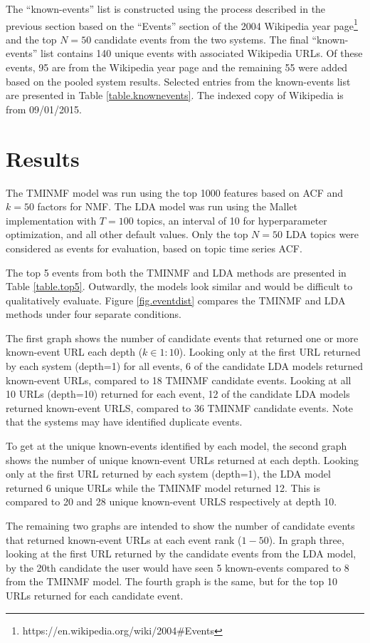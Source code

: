 \documentclass{sig-alternate}
\begin{document}
The ``known-events'' list is constructed using the process described in the previous section based on the ``Events'' section of the 2004 Wikipedia year page\footnote{https://en.wikipedia.org/wiki/2004\#Events} and the top $N=50$ candidate events from the two systems.  The final ``known-events'' list contains 140 unique events with associated Wikipedia URLs. Of these events, 95 are from the Wikipedia year page and the remaining 55 were added based on the pooled system results.  Selected entries from the known-events list are presented in Table \ref{table.knownevents}.  The indexed copy of Wikipedia is from 09/01/2015.

\section{Results}
The TMINMF model was run using the top 1000 features based on ACF and $k=50$ factors for NMF. The LDA model was run using the Mallet implementation with $T=100$ topics, an interval of 10 for hyperparameter optimization, and all other default values. Only the top $N=50$ LDA topics were considered as events for evaluation, based on topic time series ACF.

The top 5 events from both the TMINMF and LDA methods are presented in Table \ref{table.top5}. Outwardly, the models look similar and would be difficult to qualitatively evaluate.  Figure \ref{fig.eventdist} compares the TMINMF and LDA methods under four separate conditions.  

The first graph shows the number of candidate events that returned one or more known-event URL each depth ($k \in 1:10$). Looking only at the first URL  returned by each system (depth=1) for all events, 6 of the candidate LDA models returned known-event URLs, compared to 18 TMINMF candidate events. Looking at all 10 URLs (depth=10) returned for each event, 12 of the candidate LDA models returned known-event URLS, compared to 36 TMINMF candidate events.  Note that the systems may have identified duplicate events.

To get at the unique known-events identified by each model, the second graph shows the number of unique known-event URLs returned at each depth. Looking only at the first URL returned by each system (depth=1), the LDA model returned 6 unique URLs while the TMINMF model returned 12. This is compared to 20 and 28 unique known-event URLS respectively at depth 10. 

The remaining two graphs are intended to show the number of candidate events that returned known-event URLs at each event rank ($1-50$). In graph three, looking at the first URL returned by the candidate events from the LDA model, by the 20th candidate the user would have seen 5 known-events compared to 8 from the TMINMF model. The fourth graph is the same, but for the top 10 URLs returned for each candidate event.
\end{document}
